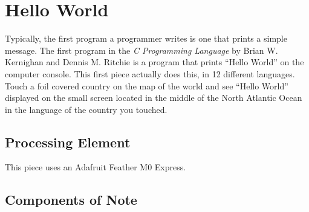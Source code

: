 %
%
%
%
% 
%
%
%
%
%
% 
%

\section{Hello World}

Typically, the first program a programmer writes is one that prints a simple 
message.  The first program in the \textit{C Programming Language} by  Brian 
W. Kernighan and Dennis M. Ritchie is a program that prints ``Hello World'' on 
the computer console.  This first piece actually does this, in 12 different 
languages.  Touch a foil covered country on the map of the world and see 
``Hello World'' displayed on the small screen located in the middle of the 
North Atlantic Ocean in the language of the country you touched.

\subsection*{Processing Element}

This piece uses an Adafruit Feather M0 Express.

\subsection*{Components of Note}

